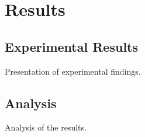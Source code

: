 \chapter{Results}

\section{Experimental Results}

Presentation of experimental findings.

\section{Analysis}

Analysis of the results.
